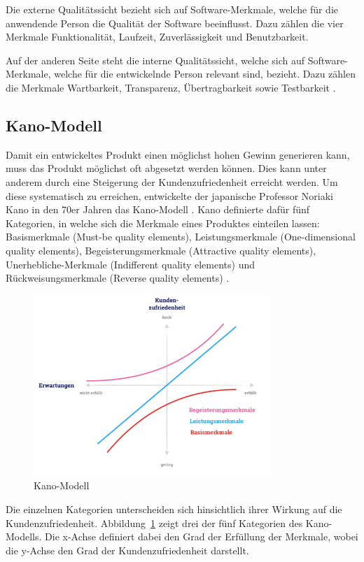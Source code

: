 Die externe Qualitätssicht bezieht sich auf Software-Merkmale, welche für die anwendende Person die Qualität der Software beeinflusst.
Dazu zählen die vier Merkmale Funktionalität, Laufzeit, Zuverlässigkeit und Benutzbarkeit.

Auf der anderen Seite steht die interne Qualitätssicht, welche sich auf Software-Merkmale, welche für die entwickelnde Person relevant sind, bezieht.
Dazu zählen die Merkmale Wartbarkeit, Transparenz, Übertragbarkeit sowie Testbarkeit \autocite[vgl.][S. 6-10]{hoffmann_software-qualitat_2013}.

\subsection{Kano-Modell}
Damit ein entwickeltes Produkt einen möglichst hohen Gewinn generieren kann, muss das Produkt möglichst oft abgesetzt werden können.
Dies kann unter anderem durch eine Steigerung der Kundenzufriedenheit erreicht werden.
Um diese systematisch zu erreichen, entwickelte der japanische Professor Noriaki Kano in den 70er Jahren das Kano-Modell \autocite[vgl.][S. 27]{sauerwein_kano-modell_2000}.
Kano definierte dafür fünf Kategorien, in welche sich die Merkmale eines Produktes einteilen lassen: 
Basismerkmale (Must-be quality elements), Leistungsmerkmale (One-dimensional quality elements), Begeisterungsmerkmale (Attractive quality elements), Unerhebliche-Merkmale (Indifferent quality elements) und Rückweisungsmerkmale (Reverse quality elements) \autocite[vgl.][S. 82-83]{holzing_kano-theorie_2008}.

\begin{figure}
  \centering
  \includegraphics[width=0.8\textwidth, keepaspectratio]{images/kano-modell.png}
  \caption{Kano-Modell \autocite{diehl_kano_2019}}
  \label{fig:kano-modell}
\end{figure}
Die einzelnen Kategorien unterscheiden sich hinsichtlich ihrer Wirkung auf die Kundenzufriedenheit.
Abbildung~\ref{fig:kano-modell} zeigt drei der fünf Kategorien des Kano-Modells.
Die x-Achse definiert dabei den Grad der Erfüllung der Merkmale, wobei die y-Achse den Grad der Kundenzufriedenheit darstellt.

